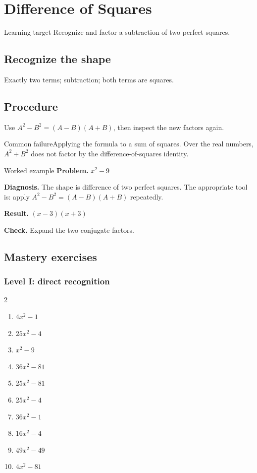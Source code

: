 \documentclass[11pt,oneside]{book}
\begin{document}
\chapter{Difference of Squares}
\begin{rulebox}{Learning target}
Recognize and factor a subtraction of two perfect squares.
\end{rulebox}
\section{Recognize the shape}
Exactly two terms; subtraction; both terms are squares.
\section{Procedure}
Use $A^2-B^2=(A-B)(A+B)$, then inspect the new factors again.

\begin{warningbox}{Common failure}Applying the formula to a sum of squares. Over the real numbers, $A^2+B^2$ does not factor by the difference-of-squares identity.\end{warningbox}
\begin{examplebox}{Worked example}
\textbf{Problem.} $ x^{2} - 9 $

\textbf{Diagnosis.} The shape is difference of two perfect squares. The appropriate tool is: apply $A^2-B^2=(A-B)(A+B)$ repeatedly.

\textbf{Result.} $ \left(x - 3\right) \left(x + 3\right) $

\textbf{Check.} Expand the two conjugate factors.
\end{examplebox}
\section{Mastery exercises}
\subsection*{Level I: direct recognition}
\begin{multicols}{2}
\begin{enumerate}[leftmargin=*,label=\textbf{\arabic*.},itemsep=0.65\baselineskip]
\item $ 4 x^{2} - 1 $
\item $ 25 x^{2} - 4 $
\item $ x^{2} - 9 $
\item $ 36 x^{2} - 81 $
\item $ 25 x^{2} - 81 $
\item $ 25 x^{2} - 4 $
\item $ 36 x^{2} - 1 $
\item $ 16 x^{2} - 4 $
\item $ 49 x^{2} - 49 $
\item $ 4 x^{2} - 81 $
\end{enumerate}
\end{multicols}
\end{document}
